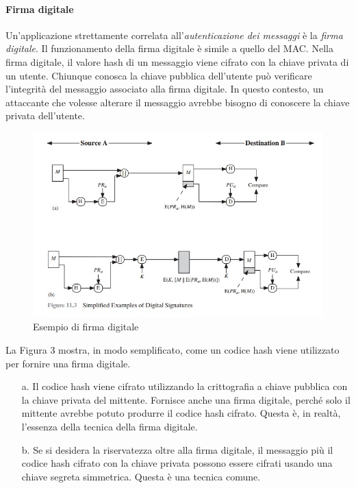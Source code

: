 \documentclass{article}
\theoremstyle{definition}
\begin{document}
\paragraph{Firma digitale}
Un'applicazione strettamente correlata all'\textit{autenticazione dei messaggi} è la \textit{firma digitale}. Il funzionamento della firma digitale è simile a quello del MAC. Nella firma digitale, il valore hash di un messaggio viene cifrato con la chiave privata di un utente. Chiunque conosca la chiave pubblica dell'utente può verificare l'integrità del messaggio associato alla firma digitale. In questo contesto, un attaccante che volesse alterare il messaggio avrebbe bisogno di conoscere la chiave privata dell'utente.

\begin{figure}[H]
    \centering
    \includegraphics[width=\textwidth]{img/digital.jpg}
    \caption{Esempio di firma digitale}
    \label{fig:itm}
\end{figure}


La Figura 3 mostra, in modo semplificato, come un codice hash viene utilizzato per fornire una firma digitale.

\begin{itemize}
    \item[a.] Il codice hash viene cifrato utilizzando la crittografia a chiave pubblica con la chiave privata del mittente. Fornisce anche una firma digitale, perché solo il mittente avrebbe potuto produrre il codice hash cifrato. Questa è, in realtà, l'essenza della tecnica della firma digitale.
    \item[b.] Se si desidera la riservatezza oltre alla firma digitale, il messaggio più il codice hash cifrato con la chiave privata possono essere cifrati usando una chiave segreta simmetrica. Questa è una tecnica comune.
\end{itemize}
\end{document}
